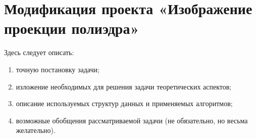 \section{Модификация проекта «Изображение проекции полиэдра»}

Здесь следует описать:

\begin{enumerate}[1)]
\item точную постановку задачи; 
\item изложение необходимых для решения задачи теоретических аспектов;
\item описание используемых структур данных и применяемых алгоритмов;
\item возможные обобщения рассматриваемой задачи (не обязательно, но 
      весьма желательно).
\end{enumerate}
